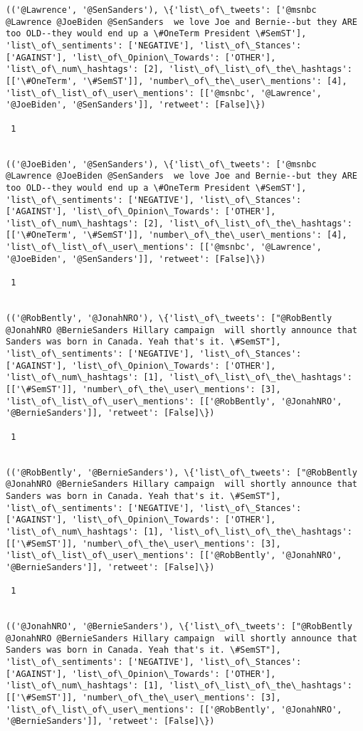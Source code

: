 \documentclass[11pt]{article}
\begin{document}
\begin{Verbatim}[commandchars=\\\{\}]
(('@Lawrence', '@SenSanders'), \{'list\_of\_tweets': ['@msnbc @Lawrence @JoeBiden @SenSanders  we love Joe and Bernie--but they ARE too OLD--they would end up a \#OneTerm President \#SemST'], 'list\_of\_sentiments': ['NEGATIVE'], 'list\_of\_Stances': ['AGAINST'], 'list\_of\_Opinion\_Towards': ['OTHER'], 'list\_of\_num\_hashtags': [2], 'list\_of\_list\_of\_the\_hashtags': [['\#OneTerm', '\#SemST']], 'number\_of\_the\_user\_mentions': [4], 'list\_of\_list\_of\_user\_mentions': [['@msnbc', '@Lawrence', '@JoeBiden', '@SenSanders']], 'retweet': [False]\})

 1
 

(('@JoeBiden', '@SenSanders'), \{'list\_of\_tweets': ['@msnbc @Lawrence @JoeBiden @SenSanders  we love Joe and Bernie--but they ARE too OLD--they would end up a \#OneTerm President \#SemST'], 'list\_of\_sentiments': ['NEGATIVE'], 'list\_of\_Stances': ['AGAINST'], 'list\_of\_Opinion\_Towards': ['OTHER'], 'list\_of\_num\_hashtags': [2], 'list\_of\_list\_of\_the\_hashtags': [['\#OneTerm', '\#SemST']], 'number\_of\_the\_user\_mentions': [4], 'list\_of\_list\_of\_user\_mentions': [['@msnbc', '@Lawrence', '@JoeBiden', '@SenSanders']], 'retweet': [False]\})

 1
 

(('@RobBently', '@JonahNRO'), \{'list\_of\_tweets': ["@RobBently @JonahNRO @BernieSanders Hillary campaign  will shortly announce that Sanders was born in Canada. Yeah that's it. \#SemST"], 'list\_of\_sentiments': ['NEGATIVE'], 'list\_of\_Stances': ['AGAINST'], 'list\_of\_Opinion\_Towards': ['OTHER'], 'list\_of\_num\_hashtags': [1], 'list\_of\_list\_of\_the\_hashtags': [['\#SemST']], 'number\_of\_the\_user\_mentions': [3], 'list\_of\_list\_of\_user\_mentions': [['@RobBently', '@JonahNRO', '@BernieSanders']], 'retweet': [False]\})

 1
 

(('@RobBently', '@BernieSanders'), \{'list\_of\_tweets': ["@RobBently @JonahNRO @BernieSanders Hillary campaign  will shortly announce that Sanders was born in Canada. Yeah that's it. \#SemST"], 'list\_of\_sentiments': ['NEGATIVE'], 'list\_of\_Stances': ['AGAINST'], 'list\_of\_Opinion\_Towards': ['OTHER'], 'list\_of\_num\_hashtags': [1], 'list\_of\_list\_of\_the\_hashtags': [['\#SemST']], 'number\_of\_the\_user\_mentions': [3], 'list\_of\_list\_of\_user\_mentions': [['@RobBently', '@JonahNRO', '@BernieSanders']], 'retweet': [False]\})

 1
 

(('@JonahNRO', '@BernieSanders'), \{'list\_of\_tweets': ["@RobBently @JonahNRO @BernieSanders Hillary campaign  will shortly announce that Sanders was born in Canada. Yeah that's it. \#SemST"], 'list\_of\_sentiments': ['NEGATIVE'], 'list\_of\_Stances': ['AGAINST'], 'list\_of\_Opinion\_Towards': ['OTHER'], 'list\_of\_num\_hashtags': [1], 'list\_of\_list\_of\_the\_hashtags': [['\#SemST']], 'number\_of\_the\_user\_mentions': [3], 'list\_of\_list\_of\_user\_mentions': [['@RobBently', '@JonahNRO', '@BernieSanders']], 'retweet': [False]\})


\end{Verbatim}
\end{document}
